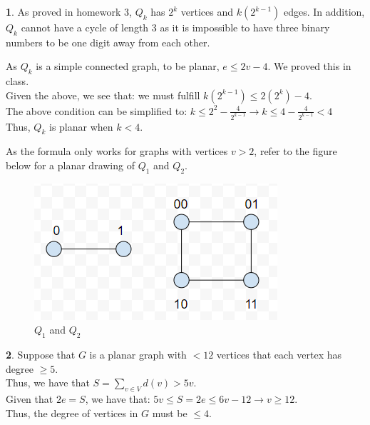 \documentclass[12pt,a4paper]{article}
\theoremstyle{definition}
\newtheorem{problem}{}
\begin{document}
\begin{problem}

As proved in homework 3, $Q_k$ has $2^k$ vertices and $k(2^{k-1})$ edges. In addition, $Q_k$ cannot have a cycle of length 3 as it is impossible to have three binary numbers to be one digit away from each other.

As $Q_k$ is a simple connected graph, to be planar, $e \leq 2v - 4$. We proved this in class. \\

Given the above, we see that: we must fulfill $k(2^{k - 1}) \leq 2(2^k) - 4$. \\

The above condition can be simplified to: $k \leq 2^2 - \frac{4}{2^{k - 1}} \rightarrow k \leq 4 - \frac{4}{2^{k - 1}} < 4$\\

Thus, $Q_k$ is planar when $k < 4$.

As the formula only works for graphs with vertices $v > 2$, refer to the figure below for a planar drawing of $Q_1$ and $Q_2$.

\begin{figure}[H]
    \centering
    \includegraphics[scale=0.6]{q5.png}
    \caption{$Q_1$ and $Q_2$}
    \label{fig:my_label}
\end{figure}

\end{problem}

\begin{problem}

Suppose that $G$ is a planar graph with $< 12$ vertices that each vertex has degree $\geq 5$. \\

Thus, we have that $S = \sum_{v \in V} d(v) > 5v$. \\

Given that $2e = S$, we have that: $5v \leq S = 2e \leq 6v - 12 \rightarrow v \geq 12$. \\

Thus, the degree of vertices in $G$ must be $\leq 4$.

\end{problem}
\end{document}
